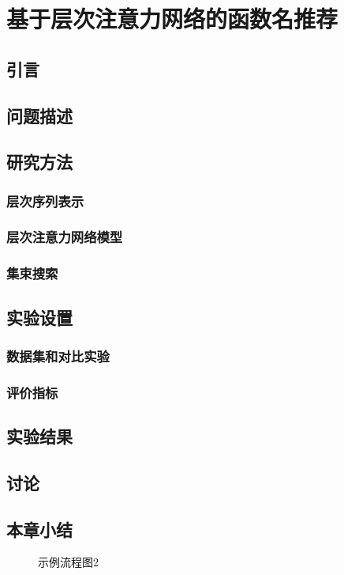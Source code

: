 
\chapter{基于层次注意力网络的函数名推荐}
\label{chpt:method}
\section{引言}
\section{问题描述}
\section{研究方法}
\subsection{层次序列表示}
\subsection{层次注意力网络模型}
\subsection{集束搜索}
\section{实验设置}
\subsection{数据集和对比实验}
\subsection{评价指标}
\section{实验结果}
\section{讨论}
\section{本章小结}




\begin{figure}
    \centering
    
    \caption{\label{fig:exmaple2} 示例流程图2}
\end{figure}


